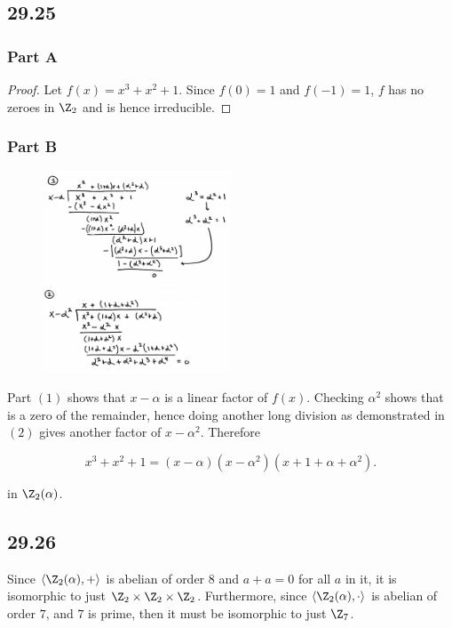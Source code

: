 \documentclass[12pt,titlepage]{extarticle}
\begin{document}
\pagebreak

\subsection*{29.25}
\subsubsection*{Part A}
\begin{proof}
    Let $f(x) = x^3 + x^2 + 1$. Since $f(0) = 1$ and $f(-1) = 1$, $f$ has no zeroes in $\Z_2$ and is hence irreducible.
\end{proof}

\subsubsection*{Part B}
\begin{figure}
    \begin{center}
        \includegraphics[page=1,width=0.5\textwidth]{longdiv2.pdf}
    \end{center}
\end{figure}

Part $(1)$ shows that $x - \alpha$ is a linear factor of $f(x)$. Checking $\alpha^2$ shows that is a zero of the remainder, hence doing another long division as demonstrated in $(2)$ gives another factor of $x - \alpha^2$. Therefore

\[
    x^3 + x^2 + 1 = (x - \alpha) (x - \alpha^2) (x + 1 + \alpha + \alpha^2)
.\]

in $\Z_2(\alpha)$.
\vspace{5cm}

\subsection*{29.26}
Since $\langle \Z_2(\alpha), + \rangle$ is abelian of order $8$ and $a + a = 0$ for all $a$ in it, it is isomorphic to just $\Z_2 \times \Z_2 \times \Z_2$. Furthermore, since $\langle \Z_2(\alpha), \cdot \rangle$ is abelian of order $7$, and $7$ is prime, then it must be isomorphic to just $\Z_7$.
\end{document}
